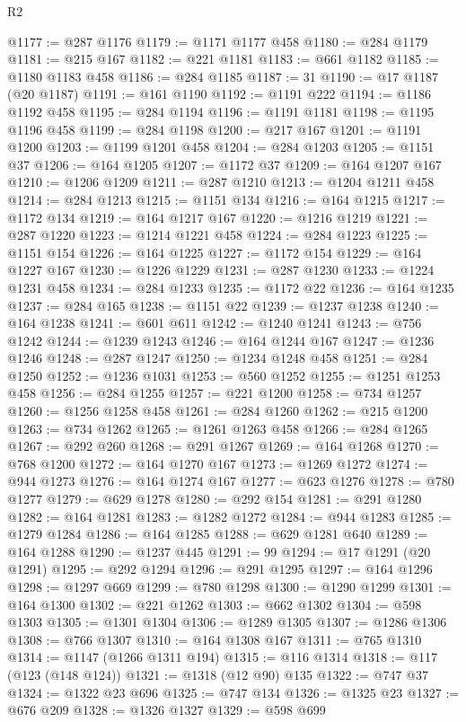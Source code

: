 \begin{lexlean}{R2}
\begin{coremodule}
@1177 := @287 @1176
@1179 := @1171 @1177 @458
@1180 := @284 @1179
@1181 := @215 @167
@1182 := @221 @1181
@1183 := @661 @1182
@1185 := @1180 @1183 @458
@1186 := @284 @1185
@1187 := 31
@1190 := @17 @1187 (@20 @1187)
@1191 := @161 @1190
@1192 := @1191 @222
@1194 := @1186 @1192 @458
@1195 := @284 @1194
@1196 := @1191 @1181
@1198 := @1195 @1196 @458
@1199 := @284 @1198
@1200 := @217 @167
@1201 := @1191 @1200
@1203 := @1199 @1201 @458
@1204 := @284 @1203
@1205 := @1151 @37
@1206 := @164 @1205
@1207 := @1172 @37
@1209 := @164 @1207 @167
@1210 := @1206 @1209
@1211 := @287 @1210
@1213 := @1204 @1211 @458
@1214 := @284 @1213
@1215 := @1151 @134
@1216 := @164 @1215
@1217 := @1172 @134
@1219 := @164 @1217 @167
@1220 := @1216 @1219
@1221 := @287 @1220
@1223 := @1214 @1221 @458
@1224 := @284 @1223
@1225 := @1151 @154
@1226 := @164 @1225
@1227 := @1172 @154
@1229 := @164 @1227 @167
@1230 := @1226 @1229
@1231 := @287 @1230
@1233 := @1224 @1231 @458
@1234 := @284 @1233
@1235 := @1172 @22
@1236 := @164 @1235
@1237 := @284 @165
@1238 := @1151 @22
@1239 := @1237 @1238
@1240 := @164 @1238
@1241 := @601 @611
@1242 := @1240 @1241
@1243 := @756 @1242
@1244 := @1239 @1243
@1246 := @164 @1244 @167
@1247 := @1236 @1246
@1248 := @287 @1247
@1250 := @1234 @1248 @458
@1251 := @284 @1250
@1252 := @1236 @1031
@1253 := @560 @1252
@1255 := @1251 @1253 @458
@1256 := @284 @1255
@1257 := @221 @1200
@1258 := @734 @1257
@1260 := @1256 @1258 @458
@1261 := @284 @1260
@1262 := @215 @1200
@1263 := @734 @1262
@1265 := @1261 @1263 @458
@1266 := @284 @1265
@1267 := @292 @260
@1268 := @291 @1267
@1269 := @164 @1268
@1270 := @768 @1200
@1272 := @164 @1270 @167
@1273 := @1269 @1272
@1274 := @944 @1273
@1276 := @164 @1274 @167
@1277 := @623 @1276
@1278 := @780 @1277
@1279 := @629 @1278
@1280 := @292 @154
@1281 := @291 @1280
@1282 := @164 @1281
@1283 := @1282 @1272
@1284 := @944 @1283
@1285 := @1279 @1284
@1286 := @164 @1285
@1288 := @629 @1281 @640
@1289 := @164 @1288
@1290 := @1237 @445
@1291 := 99
@1294 := @17 @1291 (@20 @1291)
@1295 := @292 @1294
@1296 := @291 @1295
@1297 := @164 @1296
@1298 := @1297 @669
@1299 := @780 @1298
@1300 := @1290 @1299
@1301 := @164 @1300
@1302 := @221 @1262
@1303 := @662 @1302
@1304 := @598 @1303
@1305 := @1301 @1304
@1306 := @1289 @1305
@1307 := @1286 @1306
@1308 := @766 @1307
@1310 := @164 @1308 @167
@1311 := @765 @1310
@1314 := @1147 (@1266 @1311 @194)
@1315 := @116 @1314
@1318 := @117 (@123 (@148 @124))
@1321 := @1318 (@12 @90) @135
@1322 := @747 @37
@1324 := @1322 @23 @696
@1325 := @747 @134
@1326 := @1325 @23
@1327 := @676 @209
@1328 := @1326 @1327
@1329 := @598 @699

\end{coremodule}
\end{lexlean}
